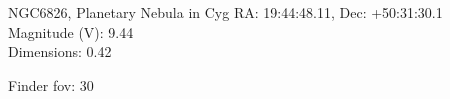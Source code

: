 \begin{block}{NGC6826, Planetary Nebula in Cyg}
    RA: 19:44:48.11, Dec: +50:31:30.1 \\ 
    Magnitude (V): 9.44 \\ 
    Dimensions: 0.42 

    Finder fov: 30 
\end{block}